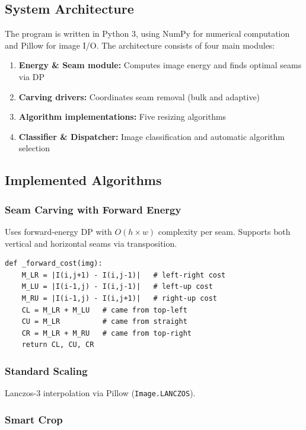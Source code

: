 \documentclass[12pt,a4paper]{article}
\begin{document}
\subsection{System Architecture}

The program is written in Python 3, using NumPy for numerical computation and Pillow for image I/O. The architecture consists of four main modules:

\begin{enumerate}
    \item \textbf{Energy \& Seam module:} Computes image energy and finds optimal seams via DP
    \item \textbf{Carving drivers:} Coordinates seam removal (bulk and adaptive)
    \item \textbf{Algorithm implementations:} Five resizing algorithms
    \item \textbf{Classifier \& Dispatcher:} Image classification and automatic algorithm selection
\end{enumerate}

\subsection{Implemented Algorithms}

\subsubsection{Seam Carving with Forward Energy}

Uses forward-energy DP with $O(h \times w)$ complexity per seam. Supports both vertical and horizontal seams via transposition.

\begin{lstlisting}
def _forward_cost(img):
    M_LR = |I(i,j+1) - I(i,j-1)|   # left-right cost
    M_LU = |I(i-1,j) - I(i,j-1)|   # left-up cost
    M_RU = |I(i-1,j) - I(i,j+1)|   # right-up cost
    CL = M_LR + M_LU   # came from top-left
    CU = M_LR          # came from straight
    CR = M_LR + M_RU   # came from top-right
    return CL, CU, CR
\end{lstlisting}

\subsubsection{Standard Scaling}

Lanczos-3 interpolation via Pillow (\texttt{Image.LANCZOS}).

\subsubsection{Smart Crop}
\end{document}
